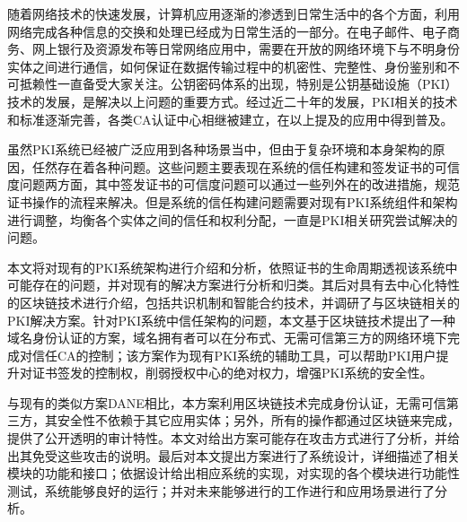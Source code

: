 
\begin{cabstract}




随着网络技术的快速发展，计算机应用逐渐的渗透到日常生活中的各个方面，利用网络完成各种信息的交换和处理已经成为日常生活的一部分。在电子邮件、电子商务、网上银行及资源发布等日常网络应用中，需要在开放的网络环境下与不明身份实体之间进行通信，如何保证在数据传输过程中的机密性、完整性、身份鉴别和不可抵赖性一直备受大家关注。公钥密码体系的出现，特别是公钥基础设施（PKI）技术的发展，是解决以上问题的重要方式。经过近二十年的发展，PKI相关的技术和标准逐渐完善，各类CA认证中心相继被建立，在以上提及的应用中得到普及。


虽然PKI系统已经被广泛应用到各种场景当中，但由于复杂环境和本身架构的原因，任然存在着各种问题。这些问题主要表现在系统的信任构建和签发证书的可信度问题两方面，其中签发证书的可信度问题可以通过一些列外在的改进措施，规范证书操作的流程来解决。但是系统的信任构建问题需要对现有PKI系统组件和架构进行调整，均衡各个实体之间的信任和权利分配，一直是PKI相关研究尝试解决的问题。


本文将对现有的PKI系统架构进行介绍和分析，依照证书的生命周期透视该系统中可能存在的问题，并对现有的解决方案进行分析和归类。其后对具有去中心化特性的区块链技术进行介绍，包括共识机制和智能合约技术，并调研了与区块链相关的PKI解决方案。针对PKI系统中信任架构的问题，本文基于区块链技术提出了一种域名身份认证的方案，域名拥有者可以在分布式、无需可信第三方的网络环境下完成对信任CA的控制；该方案作为现有PKI系统的辅助工具，可以帮助PKI用户提升对证书签发的控制权，削弱授权中心的绝对权力，增强PKI系统的安全性。

与现有的类似方案DANE相比，本方案利用区块链技术完成身份认证，无需可信第三方，其安全性不依赖于其它应用实体；另外，所有的操作都通过区块链来完成，提供了公开透明的审计特性。本文对给出方案可能存在攻击方式进行了分析，并给出其免受这些攻击的说明。最后对本文提出方案进行了系统设计，详细描述了相关模块的功能和接口；依据设计给出相应系统的实现，对实现的各个模块进行功能性测试，系统能够良好的运行；并对未来能够进行的工作进行和应用场景进行了分析。


\end{cabstract}
